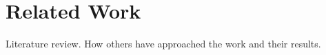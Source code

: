 \chapter{Related Work}
\label{sec:related_work}

Literature review. How others have approached the work and their results.
